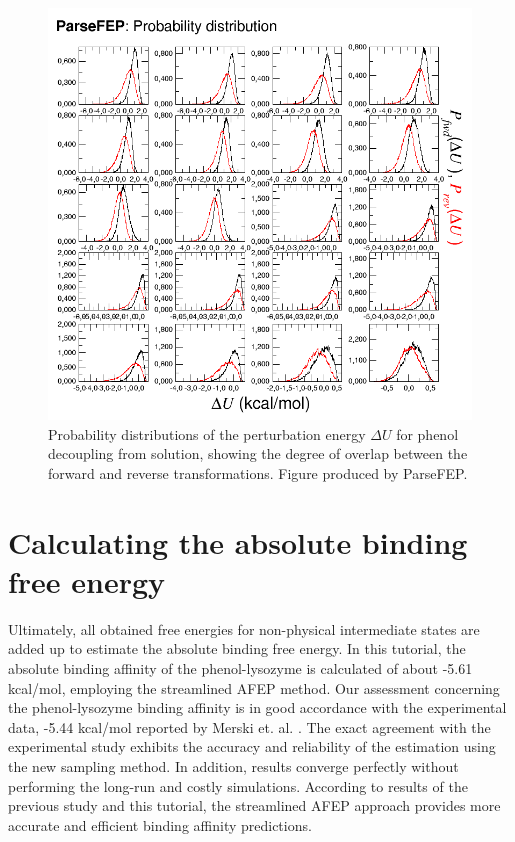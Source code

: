 \documentclass[9pt,tutorial]{livecoms}
\begin{document}
\begin{figure}[h!t]
\centering
\includegraphics[width=0.6\linewidth]{AFEP2-prob}
\caption{Probability distributions of the perturbation energy $\Delta U$ for phenol decoupling from solution, showing the degree of overlap between the forward and reverse transformations. Figure produced by ParseFEP.}
\label{fig:AFEP2-3}
\end{figure}

\section{Calculating the absolute binding free energy}\label{sec:12}

Ultimately, all obtained free energies for non-physical intermediate states are added up to estimate the absolute binding free energy. In this tutorial, the absolute binding affinity of the phenol-lysozyme is calculated of about -5.61 kcal/mol, employing the streamlined AFEP method. Our assessment concerning the phenol-lysozyme binding affinity is in good accordance with the experimental data, -5.44 kcal/mol reported by Merski et. al. \cite{Merski2013}. The exact agreement with the experimental study exhibits the accuracy and reliability of the estimation using the new sampling method. In addition, results converge perfectly without performing the long-run and costly simulations. According to results of the previous study \cite{Salari2018} and this tutorial, the streamlined AFEP approach provides more accurate and efficient binding affinity predictions.
\end{document}
